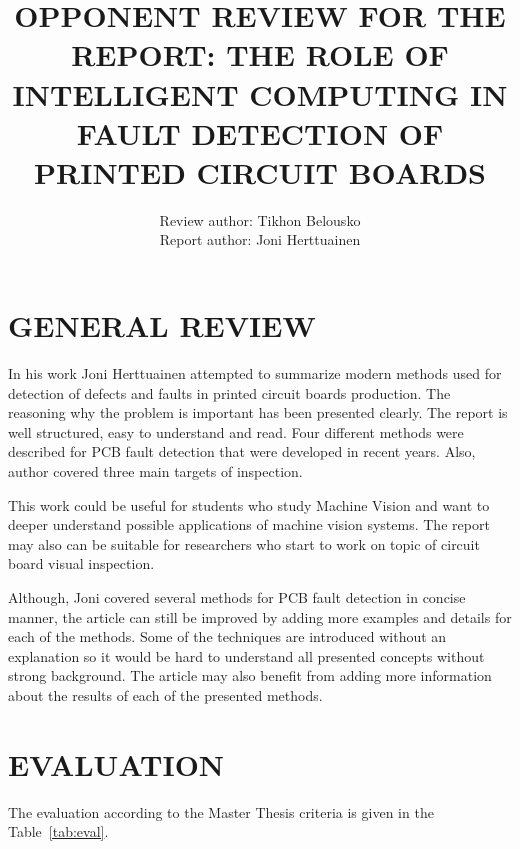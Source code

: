 \documentclass{lutmscthesis}[2010/09/22]
\title{OPPONENT REVIEW FOR THE REPORT:
THE ROLE OF INTELLIGENT COMPUTING IN FAULT DETECTION OF PRINTED CIRCUIT BOARDS}
\author{Review author: Tikhon Belousko \\
Report author: Joni Herttuainen}
\begin{document}

\maketitle
\newpage

\section{ GENERAL REVIEW }
\setlength{\parskip}{3ex}

In his work Joni Herttuainen attempted to summarize modern methods used
for detection of defects and faults in printed circuit boards production.
The reasoning why the problem is important has been presented clearly.
The report is well structured, easy to understand and read.
Four different methods were described for PCB fault detection that
were developed in recent years. Also, author covered three
main targets of inspection.

This work could be useful for students who study Machine Vision and want
to deeper understand possible applications of machine vision systems.
The report may also can be suitable for
researchers who start to work on topic of circuit board visual inspection.

Although, Joni covered several methods for PCB fault detection in concise
manner, the article can still be improved by adding more examples and details for
each of the methods. Some of the techniques are introduced without an explanation
so it would be hard to understand all presented concepts without strong background.
The article may also benefit from adding more information about the results of
each of the presented methods.

\section{ EVALUATION }

The evaluation according to the Master Thesis criteria is given in the Table~\ref{tab:eval}.
\end{document}
